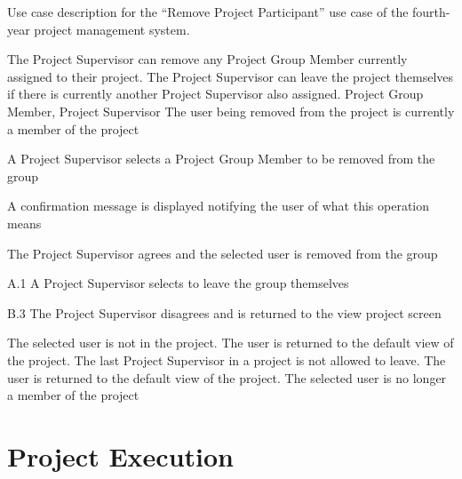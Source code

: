 \documentclass[document.tex]{subfiles}
\begin{document}
\begin{table}[!htbp]
  \centering
  \caption{Use case description for the ``Remove Project Participant'' use case of the fourth-year project management system.}
  \label{tbl:use-case-leave-project}

  \begin{usecase}
    The Project Supervisor can remove any Project Group Member currently assigned to their project. The Project Supervisor can leave the project themselves if there is currently another Project Supervisor also assigned.
    Project Group Member, Project Supervisor
    The user being removed from the project is currently a member of the project
    \ucnormal
    \begin{ucenum}
      \item A Project Supervisor selects a Project Group Member to be removed from the group
      \item A confirmation message is displayed notifying the user of what this operation means
      \item The Project Supervisor agrees and the selected user is removed from the group
    \end{ucenum}
    \begin{ucenum*}
      \item [A.1] A Project Supervisor selects to leave the group themselves
    \end{ucenum*}
    \begin{ucenum}
      \item [B.3] The Project Supervisor disagrees and is returned to the view project screen
    \end{ucenum}
    The selected user is not in the project. The user is returned to the default view of the project.
    The last Project Supervisor in a project is not allowed to leave. The user is returned to the default view of the project.
    The selected user is no longer a member of the project
  \end{usecase}
\end{table}


\FloatBarrier
{}
\section {Project Execution}
\label {sec:detailed-use-cases-1-execution}
\end{document}
